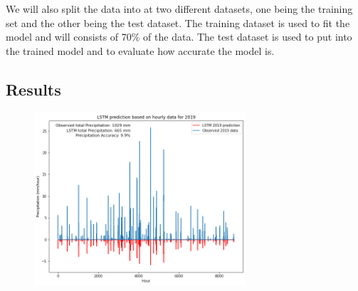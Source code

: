 \documentclass[11pt]{report}
\begin{document}
We will also split the data into at two different datasets, one being the training set and the other being the test dataset. The training dataset is used to fit the model and will consists of 70\% of the data. The test dataset is used to put into the trained model and to evaluate how accurate the model is.



\subsection{Results}
\clearpage
\begin{figure}[th!]
	\centering
	\includegraphics[width = 0.7\textwidth]{Figures/LSTM_hour.png}
	\caption[Comparing LSTM results to observed precipitation in 2019 by hour]{
	}
\end{figure}
\end{document}
